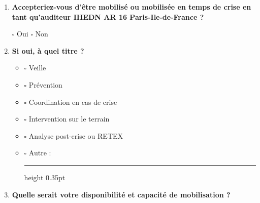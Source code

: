 \documentclass[12pt,a4paper]{article}
\newcommand{\Case}{\(\square\)}
\newcommand{\Ligne}{\leavevmode\leaders\hrule height 0.35pt\hfill\kern0pt}
\newcommand{\Question}[1]{\item \textbf{#1}\par\vspace{0.1em}}
\begin{document}
\begin{enumerate}[label=\textbf{\arabic*.},leftmargin=0pt,itemindent=1.9em,labelwidth=1.4em,labelsep=0.5em,resume]

\Question{Accepteriez-vous d'être mobilisé ou mobilisée en temps de crise en tant qu'auditeur IHEDN AR 16 Paris-Ile-de-France ?}

\Case{} Oui \hspace{1cm} \Case{} Non

\Question{Si oui, à quel titre ?}

\begin{itemize}[leftmargin=1.5cm]
    \item[] \Case{} Veille
    \item[] \Case{} Prévention
    \item[] \Case{} Coordination en cas de crise
    \item[] \Case{} Intervention sur le terrain
    \item[] \Case{} Analyse post-crise ou RETEX
    \item[] \Case{} Autre : \Ligne
\end{itemize}

\Question{Quelle serait votre disponibilité et capacité de mobilisation ?}


\end{enumerate}
\end{document}
